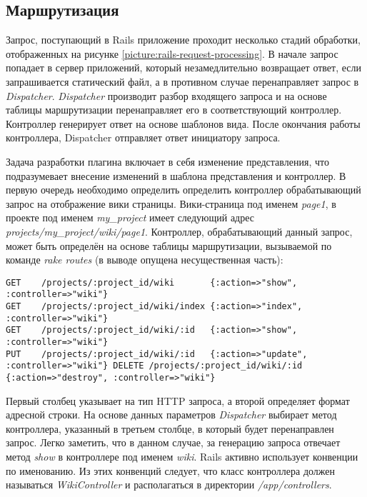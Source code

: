 \subsection{Маршрутизация}
\label{section:routing}
Запрос, поступающий в Rails приложение проходит несколько стадий обработки,
отображенных на рисунке \ref{picture:rails-request-processing}.
В начале запрос попадает в сервер приложений, который незамедлительно
возвращает ответ, если запрашивается статический файл, а в противном случае
перенаправляет запрос в \textit{Dispatcher}. \textit{Dispatcher} производит
разбор входящего запроса и на основе таблицы маршрутизации перенаправляет его в
соответствующий контроллер.
Контроллер генерирует ответ на основе шаблонов вида. После окончания работы
контроллера, Dispatcher отправляет ответ инициатору запроса.


Задача разработки плагина включает в себя изменение представления, что
подразумевает внесение изменений в шаблона представления и контроллер. В первую
очередь необходимо определить определить контроллер обрабатывающий запрос на
отображение вики страницы. Вики-страница под именем \textit{page1}, в проекте
под именем \textit{my\_project} имеет следующий адрес
\textit{projects/my\_project/wiki/page1}.
Контроллер, обрабатывающий данный запрос, может быть определён на основе
таблицы маршрутизации, вызываемой по команде \textit{rake routes} (в выводе
опущена несущественная часть):
\small{\begin{lstlisting}
GET    /projects/:project_id/wiki       {:action=>"show", :controller=>"wiki"}
GET    /projects/:project_id/wiki/index {:action=>"index", :controller=>"wiki"}
GET    /projects/:project_id/wiki/:id   {:action=>"show", :controller=>"wiki"}
PUT    /projects/:project_id/wiki/:id   {:action=>"update",
:controller=>"wiki"} DELETE /projects/:project_id/wiki/:id  
{:action=>"destroy", :controller=>"wiki"}
\end{lstlisting}}
Первый столбец указывает на тип HTTP запроса, а второй определяет формат
адресной строки. На основе данных параметров \textit{Dispatcher} выбирает метод
контроллера, указанный в третьем столбце, в который будет перенаправлен запрос.
Легко заметить, что в данном случае, за генерацию запроса отвечает метод
\textit{show} в контроллере под именем \textit{wiki}. Rails активно использует
конвенции по именованию.
Из этих конвенций следует, что класс контроллера должен называться
\textit{WikiController} и располагаться в директории \textit{/app/controllers}.

